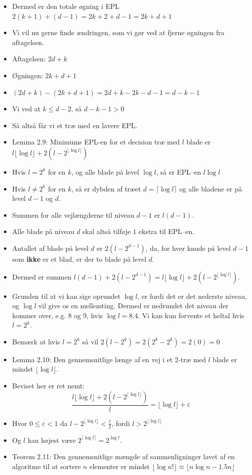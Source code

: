 \begin{frame}[allowframebreaks]
\begin{itemize}
	\item Dermed er den totale øgning i EPL $2(k+1)+(d-1)=2k+2+d-1=2k+d+1$
	\item Vi vil nu gerne finde ændringen, som vi gør ved at fjerne øgningen fra aftagelsen.
	\item Aftagelsen: $2d+k$
	\item Øgningen: $2k+d+1$
	\item $(2d+k)-(2k+d+1) = 2d+k-2k-d-1=d-k-1$
	\item Vi ved at $k \le d-2$, så $d-k-1 > 0 $
	\item Så altså får vi et træ med en lavere EPL.
	\item Lemma 2.9: Minimums EPL-en for et decision træ med $l$ blade er $l \lfloor \log l \rfloor + 2(l-2^{\lfloor \log l\rfloor })$
	\item Hvis $l = 2^{k}$  for en $k$, og alle blade på level $\log l$, så er EPL--en $l \log l$
	\item Hvis $l \ne 2^{k}$ for en $k$, så er dybden af træet $d = \lceil \log l \rceil$ og alle bladene er på level $d-1$ og $d$.
	\item Summen for alle vejlængderne til niveau $d-1$ er $l(d-1)$.
	\item Alle blade på niveau $d$ skal altså tilføje $1$ ekstra til EPL--en.
	\item Antallet af blade på level $d$ er $2(l-2^{d-1})$, da, for hver knude på level $d-1$ som \textbf{ikke} er et blad, er der to blade på level $d$.
	\item Dermed er summen $l(d-1)+2(l-2^{d-1}) = l \lfloor \log l \rfloor + 2(l-2^{\lfloor \log l \rfloor})$.
	\item Grunden til at vi kan sige oprundet $\log l$, er fordi det er det nederste niveau, og $\log l$ vil give os en mellemting. Dermed er nedrundet det niveau der kommer over, e.g. 8 og 9, hvis $\log l = 8.4$. Vi kan kun forvente et heltal hvis $l = 2^{k}$.
	\item Bemærk at hvis $l = 2^{k}$ så vil $2(l-2^{k}) = 2(2^{k}-2^{k}) = 2(0) = 0$
	\item Lemma 2.10: Den gennemsnitlige længe af en vej i et 2-træ med $l$ blade er mindst $\lfloor \log l \rfloor$.
	\item Beviset her er ret nemt:
		  \begin{equation}
\frac{l \lfloor \log l \rfloor + 2(l-2^{\lfloor \log l \rfloor})}{l}  = \lfloor \log l\rfloor + \varepsilon
		  \end{equation}

	\item Hvor \(0 \le \varepsilon < 1\) da $l-2^{\lfloor \log l \rfloor }< \frac{l}{2}$, fordi $l > 2^{\lfloor \log l \rfloor}$
    \item Og $l$ kan højest være $2^{\lceil \log l \rceil} = 2^{\log l}$.
	\item Teorem 2.11: Den gennemsnitlige mængde af sammenligninger lavet af en algoritme til at sortere $n$ elementer er mindst $\lfloor \log n! \rfloor \approx \lfloor n \log n - 1.5n \rfloor$
  \end{itemize}
\end{frame}


